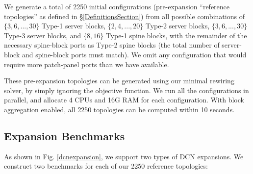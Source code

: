 \documentclass[letterpaper,twocolumn,10pt]{article}
\begin{document}
We generate a total of 2250 initial configurations (pre-expansion ``reference topologies'' as defined in \S\ref{DefinitionsSection}) from all possible combinations of $\{3,6,...,30\}$ Type-1 server blocks, $\{2,4,...,20\}$ Type-2 server blocks, $\{3,6,...,30\}$ Type-3 server blocks, and $\{8, 16\}$ Type-1 spine blocks, with the remainder of the necessary spine-block ports as Type-2 spine blocks (the total number of server-block and spine-block ports must match).   We omit any configuration that would require more patch-panel ports than we have available.

These pre-expansion topologies can be generated using our minimal rewiring solver, by simply ignoring the objective function. We run all the configurations in parallel, and allocate 4 CPUs and 16G RAM for each configuration. With block aggregation enabled, all 2250 topologies can be computed within 10 seconds.

\subsection{Expansion Benchmarks}
As shown in Fig. \ref{dcnexpansion}, we support two types of DCN expansions. We construct two benchmarks for each of our 2250 reference topologies:
\end{document}
